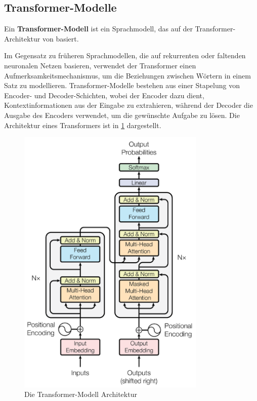 \subsection{Transformer-Modelle}\label{sec:grundlagen:transformer}

\begin{definition}\label{def:transformer-modell}
    Ein \textbf{Transformer-Modell} ist ein Sprachmodell, das auf der Transformer-Architektur von \citet{attention} basiert.
\end{definition}
Im Gegensatz zu früheren Sprachmodellen, die auf rekurrenten oder faltenden neuronalen Netzen basieren, verwendet der Transformer einen Aufmerksamkeitsmechanismus, um die Beziehungen zwischen Wörtern in einem Satz zu modellieren.
Transformer-Modelle bestehen aus einer Stapelung von Encoder- und Decoder-Schichten, wobei der Encoder dazu dient, Kontextinformationen aus der Eingabe zu extrahieren,
während der Decoder die Ausgabe des Encoders verwendet, um die gewünschte Aufgabe zu lösen.
Die Architektur eines Transformers ist in \cref{bild:transformer} dargestellt.\\

\begin{figure}[ht]
    \centering
    \includegraphics[width=0.8\textwidth]{zeichnungen/transformer.png}
    \caption[Die Transformer-Modell Architektur]{Die Transformer-Modell Architektur \citep{attention}}
    \label{bild:transformer}
\end{figure}

